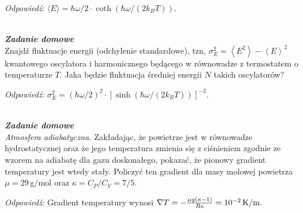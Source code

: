 \documentclass[11pt,a4paper]{article}
\newcounter{zaddom}\newcommand{\zaddom}[1][]{\addtocounter{zaddom}{1} ~\\  {\bf \emph{Zadanie domowe \arabic{zaddom} #1 }} \\}
\begin{document}
\emph{Odpowiedź:} $\langle E \rangle =  \hbar \omega/2 \cdot  \coth(\hbar \omega / (2k_B T))$. 

\zaddom
Znajdź fluktuacje energii (odchylenie standardowe), tzn,
$\sigma_E^2= \left<E^2\right> - \left<E\right>^2 $ kwantowego oscylatora i
harmonicznego będącego w równowadze z termostatem o temperaturze $T$.
Jaka będzie fluktuacja średniej energii $N$ takich oscylatorów?

\emph{Odpowiedź:} $\sigma_E^2 =  (\hbar \omega/2)^2 \cdot [\sinh(\hbar \omega / (2k_B T))]^{-2}$.





\zaddom
{\em Atmosfera adiabatyczna.} Zakładając, że powietrze jest w równowadze hydrostatycznej
oraz że jego temperatura zmienia się z ciśnieniem zgodnie ze wzorem na adiabatę dla gazu
doskonałego, pokazać, że pionowy gradient temperatury jest wtedy stały.
Policzyć ten gradient dla masy molowej powietrza $\mu=29\,$g/mol oraz
$\kappa = C_P/C_V = 7/5$.

\emph{Odpowiedź:}
Gradient temperatury wynosi $\nabla T  = -\frac{\mu g (\kappa-1)}{R\kappa } = 10^{-2}\, {\rm K}/{\rm m}. $ 

\end{document}
